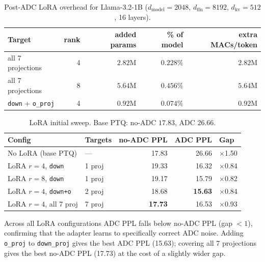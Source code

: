 \documentclass[a4paper,11pt,oneside]{article}
\theoremstyle{breakstyle}
\begin{document}
  \begin{table}[htbp]
    \centering
    \caption{Post-ADC LoRA overhead for Llama-3.2-1B
             ($d_{\mathrm{model}}=2048$, $d_{\mathrm{ffn}}=8192$,
             $d_{\mathrm{kv}}=512$, 16 layers).}
    \label{tab:lora_overhead}
    \renewcommand{\arraystretch}{1.15}
    \begin{tabular}{@{}lrrrr@{}}
      \toprule
      \textbf{Target} & \textbf{rank} & \textbf{added params} & \textbf{\% of model} & \textbf{extra MACs/token} \\
      \midrule
      all 7 projections                & 4 & $2.82$M & $0.228\%$ & $2.82$M \\
      all 7 projections                & 8 & $5.64$M & $0.456\%$ & $5.64$M \\
      \texttt{down} + \texttt{o\_proj} & 4 & $0.92$M & $0.074\%$ & $0.92$M \\
      \bottomrule
    \end{tabular}
  \end{table}

  \begin{table}[htbp]
    \centering
    \caption{LoRA initial sweep. Base PTQ: no-ADC $17.83$, ADC $26.66$.}
    \label{tab:lorav6}
    \renewcommand{\arraystretch}{1.15}
    \begin{tabular}{@{}llrrl@{}}
      \toprule
      \textbf{Config} & \textbf{Targets} & \textbf{no-ADC PPL} & \textbf{ADC PPL} & \textbf{Gap} \\
      \midrule
      No LoRA (base PTQ) & — & 17.83 & 26.66 & $\times$1.50 \\
      LoRA $r=4$, \texttt{down}     & 1 proj & 19.33 & 16.32 & $\times$0.84 \\
      LoRA $r=8$, \texttt{down}     & 1 proj & 19.17 & 15.79 & $\times$0.82 \\
      LoRA $r=4$, \texttt{down+o}   & 2 proj & 18.68 & \textbf{15.63} & $\times$0.84 \\
      LoRA $r=4$, all 7 proj        & 7 proj & \textbf{17.73} & 16.53 & $\times$0.93 \\
      \bottomrule
    \end{tabular}
  \end{table}

  Across all LoRA configurations ADC PPL falls below no-ADC PPL (gap $<1$),
  confirming that the adapter learns to specifically correct ADC noise.
  Adding \texttt{o\_proj} to \texttt{down\_proj} gives the best ADC PPL
  (15.63); covering all 7 projections gives the best no-ADC PPL (17.73) at
  the cost of a slightly wider gap.
\end{document}

